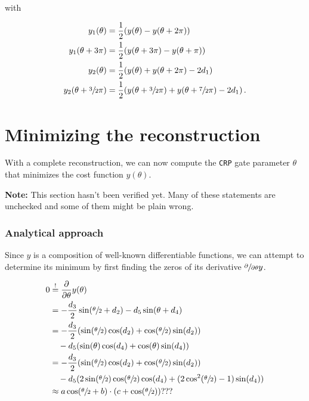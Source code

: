 with

\begin{subequations}
    \label{eq:measurements}
    \begin{align}
        y_1(\theta) &= \frac12(y(\theta) - y(\theta + 2\pi))\\
        y_1(\theta + 3\pi) &= \frac12(y(\theta + 3\pi) - y(\theta + \pi))\\
        y_2(\theta) &= \frac12(y(\theta) + y(\theta + 2\pi) - 2d_1)\\
        y_2(\theta + \sfrac32\pi) &= \frac12(y(\theta + \sfrac32\pi) + y(\theta + \sfrac72\pi) - 2d_1)
        \,.
    \end{align}
\end{subequations}

\section{Minimizing the reconstruction}
\label{sec:minimization}
With a complete reconstruction, we can now compute the \texttt{CRP} gate
parameter $\theta$ that minimizes the cost function $y(\theta)$.

\textbf{Note:} This section hasn't been verified yet.
Many of these statements are unchecked and some of them might be plain wrong.

\subsubsection*{Analytical approach}
Since $y$ is a composition of well-known differentiable functions, we can
attempt to determine its minimum by first finding the zeros of its derivative
$\sfrac{\partial}{\partial \theta}y$.

\begin{equation}
    \begin{split}
        0 &\stackrel!= \frac{\partial}{\partial\theta} y(\theta)\\
            &= -\frac{d_3}{2} \sin(\sfrac\theta2 + d_2) - d_5 \sin(\theta + d_4)\\
            &= -\frac{d_3}{2} (\sin(\sfrac\theta2)\cos(d_2) + \cos(\sfrac\theta2)\sin(d_2))\\
                &\quad - d_5 (\sin(\theta)\cos(d_4) + \cos(\theta)\sin(d_4))\\
            &= -\frac{d_3}{2} (\sin(\sfrac\theta2)\cos(d_2) + \cos(\sfrac\theta2)\sin(d_2))\\
                &\quad - d_5 (2\sin(\sfrac\theta2)\cos(\sfrac\theta2)\cos(d_4) + (2\cos^2(\sfrac\theta2) - 1)\sin(d_4))\\
            &\approx a \cos(\sfrac\theta2 + b) \cdot (c + \cos(\sfrac\theta2))???
    \end{split}
\end{equation}

